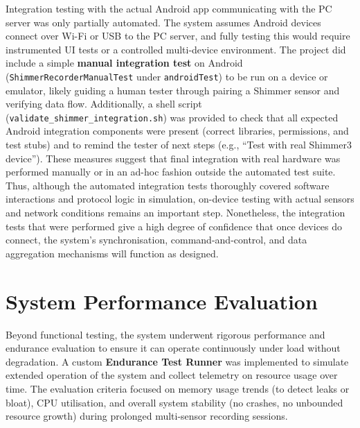 Integration testing with the actual Android app communicating with the PC server was only partially automated. The system assumes Android devices connect over Wi-Fi or USB to the PC server, and fully testing this would require instrumented UI tests or a controlled multi-device environment. The project did include a simple \textbf{manual integration test} on Android (\texttt{ShimmerRecorderManualTest} under \texttt{androidTest}) to be run on a device or emulator, likely guiding a human tester through pairing a Shimmer sensor and verifying data flow. Additionally, a shell script (\texttt{validate\_shimmer\_integration.sh}) was provided to check that all expected Android integration components were present (correct libraries, permissions, and test stubs) and to remind the tester of next steps (e.g., ``Test with real Shimmer3 device''). These measures suggest that final integration with real hardware was performed manually or in an ad-hoc fashion outside the automated test suite. Thus, although the automated integration tests thoroughly covered software interactions and protocol logic in simulation, on-device testing with actual sensors and network conditions remains an important step. Nonetheless, the integration tests that were performed give a high degree of confidence that once devices do connect, the system's synchronisation, command-and-control, and data aggregation mechanisms will function as designed.

\section{System Performance Evaluation}
Beyond functional testing, the system underwent rigorous performance and endurance evaluation to ensure it can operate continuously under load without degradation. A custom \textbf{Endurance Test Runner} was implemented to simulate extended operation of the system and collect telemetry on resource usage over time. The evaluation criteria focused on memory usage trends (to detect leaks or bloat), CPU utilisation, and overall system stability (no crashes, no unbounded resource growth) during prolonged multi-sensor recording sessions.

